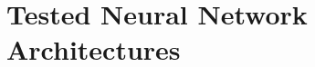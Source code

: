 \documentclass[preprint,12pt]{elsarticle}%
\begin{document}
%
%

\clearpage


\appendix


\section{Tested Neural Network Architectures}
\label{appendix:tested_architectures}

\setcounter{table}{0}
\bigskip
\end{document}
